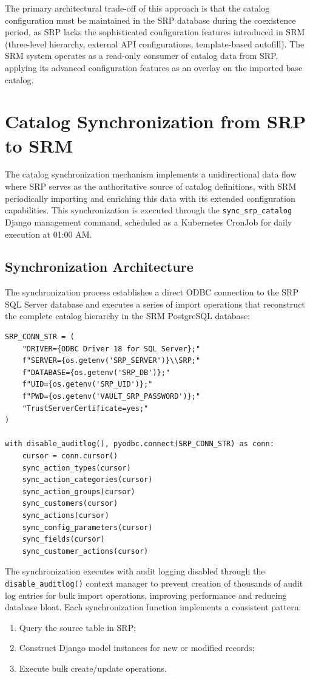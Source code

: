 The primary architectural trade-off of this approach is that the catalog configuration must be maintained in the SRP database during the coexistence period, as SRP lacks the sophisticated configuration features introduced in SRM (three-level hierarchy, external API configurations, template-based autofill). The SRM system operates as a read-only consumer of catalog data from SRP, applying its advanced configuration features as an overlay on the imported base catalog.

\section{Catalog Synchronization from SRP to SRM}

The catalog synchronization mechanism implements a unidirectional data flow where SRP serves as the authoritative source of catalog definitions, with SRM periodically importing and enriching this data with its extended configuration capabilities. This synchronization is executed through the \texttt{sync\_srp\_catalog} Django management command, scheduled as a Kubernetes CronJob for daily execution at 01:00 AM.

\subsection{Synchronization Architecture}

The synchronization process establishes a direct ODBC connection to the SRP SQL Server database and executes a series of import operations that reconstruct the complete catalog hierarchy in the SRM PostgreSQL database:

\begin{verbatim}
SRP_CONN_STR = (
    "DRIVER={ODBC Driver 18 for SQL Server};"
    f"SERVER={os.getenv('SRP_SERVER')}\\SRP;"
    f"DATABASE={os.getenv('SRP_DB')};"
    f"UID={os.getenv('SRP_UID')};"
    f"PWD={os.getenv('VAULT_SRP_PASSWORD')};"
    "TrustServerCertificate=yes;"
)

with disable_auditlog(), pyodbc.connect(SRP_CONN_STR) as conn:
    cursor = conn.cursor()
    sync_action_types(cursor)
    sync_action_categories(cursor)
    sync_action_groups(cursor)
    sync_customers(cursor)
    sync_actions(cursor)
    sync_config_parameters(cursor)
    sync_fields(cursor)
    sync_customer_actions(cursor)
\end{verbatim}

The synchronization executes with audit logging disabled through the \texttt{disable\_auditlog()} context manager to prevent creation of thousands of audit log entries for bulk import operations, improving performance and reducing database bloat. Each synchronization function implements a consistent pattern: 
\begin{enumerate}
    \item Query the source table in SRP;
    \item Construct Django model instances for new or modified records;
    \item Execute bulk create/update operations.
\end{enumerate}


